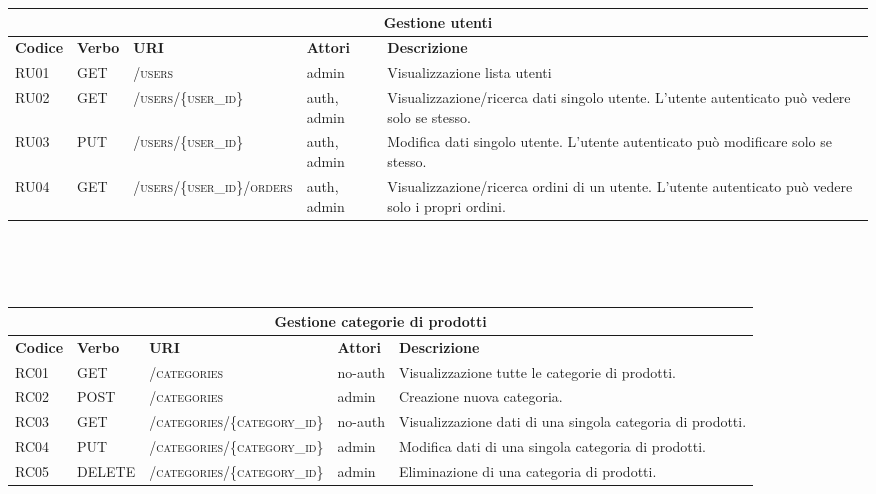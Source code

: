 \begin{tabular}{ |p{1.2cm}|p{1.5cm}|p{5cm}|p{2cm}|p{6cm}| }
    \hline
    \multicolumn{5}{|c|}{\textbf{Gestione utenti}}\\
    \hline
    \hline
    \textbf{Codice} & \textbf{Verbo} & \textbf{URI} & \textbf{Attori} & \textbf{Descrizione}\\
    \hline
    RU01 & GET & \textsc{/users} & admin & Visualizzazione lista utenti\\
    \hline
    RU02 & GET & \textsc{/users/\{user\_id\}} & auth, admin & Visualizzazione/ricerca dati singolo utente. L'utente autenticato può vedere solo se stesso.\\
    \hline
    RU03 & PUT & \textsc{/users/\{user\_id\}} & auth, admin & Modifica dati singolo utente. L'utente autenticato può modificare solo se stesso.\\
    \hline
    RU04 & GET & \textsc{/users/\{user\_id\}/orders} & auth, admin & Visualizzazione/ricerca ordini di un utente. L'utente autenticato può vedere solo i propri ordini.\\
    \hline
\end{tabular}
\\\\\\
\hspace*{-2cm}
\begin{tabular}{ |p{1.2cm}|p{1.5cm}|p{5cm}|p{2cm}|p{6cm}| }
    \hline
    \multicolumn{5}{|c|}{\textbf{Gestione categorie di prodotti}}\\
    \hline
    \hline
    \textbf{Codice} & \textbf{Verbo} & \textbf{URI} & \textbf{Attori} & \textbf{Descrizione}\\
    \hline
    RC01 & GET & \textsc{/categories} & no-auth & Visualizzazione tutte le categorie di prodotti.\\
    \hline
    RC02 & POST & \textsc{/categories} & admin & Creazione nuova categoria.\\
    \hline
    RC03 & GET & \textsc{/categories/\{category\_id\}} & no-auth & Visualizzazione dati di una singola categoria di prodotti.\\
    \hline
    RC04 & PUT & \textsc{/categories/\{category\_id\}} & admin & Modifica dati di una singola categoria di prodotti.\\
    \hline
    RC05 & DELETE & \textsc{/categories/\{category\_id\}} & admin & Eliminazione di una categoria di prodotti.\\
    \hline
\end{tabular}
\\\\\\
